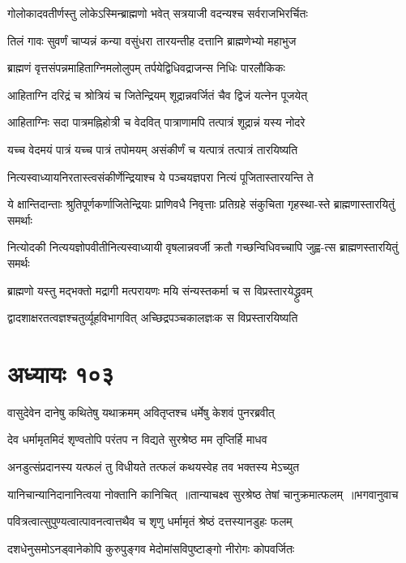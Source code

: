 \twolineshloka
{गोलोकादवतीर्णस्तु लोकेऽस्मिन्ब्राह्मणो भवेत्}
{सत्रयाजी वदन्यश्च सर्वराजभिरर्चितः}


\twolineshloka
{तिलं गावः सुवर्णं चाप्यन्नं कन्या वसुंधरा}
{तारयन्तीह दत्तानि ब्राह्मणेभ्यो महाभुज}


\twolineshloka
{ब्राह्मणं वृत्तसंपन्नमाहिताग्निमलोलुपम्}
{तर्पयेद्विधिवद्राजन्स निधिः पारलौकिकः}


\twolineshloka
{आहिताग्नि दरिद्रं च श्रोत्रियं च जितेन्द्रियम्}
{शूद्रान्नवर्जितं चैव द्विजं यत्नेन पूजयेत्}


\twolineshloka
{आहिताग्निः सदा पात्रमह्निहोत्री च वेदवित्}
{पात्राणामपि तत्पात्रं शूद्रान्नं यस्य नोदरे}


\twolineshloka
{यच्च वेदमयं पात्रं यच्च पात्रं तपोमयम्}
{असंकीर्णं च यत्पात्रं तत्पात्रं तारयिष्यति}


\twolineshloka
{नित्यस्वाध्यायनिरतास्त्वसंकीर्णेन्द्रियाश्च ये}
{पञ्चयज्ञपरा नित्यं पूजितास्तारयन्ति ते}


\twolineshloka
{ये क्षान्तिदान्ताः श्रुतिपूर्णकर्णाजितेन्द्रियाः प्राणिवधै निवृत्ताः}
{प्रतिग्रहे संकुचिता गृहस्था-स्ते ब्राह्मणास्तारयितुं समर्थाः}


\twolineshloka
{नित्योदकी नित्ययज्ञोपवीतीनित्यस्वाध्यायी वृषलान्नवर्जी}
{क्रतौ गच्छन्विधिवच्चापि जुह्व-त्स ब्राह्मणस्तारयितुं समर्थः}


\twolineshloka
{ब्राह्मणो यस्तु मद्भक्तो मद्रागी मत्परायणः}
{मयि संन्यस्तकर्मा च स विप्रस्तारयेद्ध्रुवम्}


\twolineshloka
{द्वादशाक्षरतत्वज्ञश्चतुर्व्यूहविभागवित्}
{अच्छिद्रपञ्चकालज्ञःक स विप्रस्तारयिष्यति}


\chapter{अध्यायः १०३}
\twolineshloka
{वासुदेवेन दानेषु कथितेषु यथाक्रमम्}
{अवितृप्तश्च धर्मेषु केशवं पुनरब्रवीत्}


\twolineshloka
{देव धर्मामृतमिदं शृण्वतोपि परंतप}
{न विद्यते सुरश्रेष्ठ मम तृप्तिर्हि माधव}


\twolineshloka
{अनडुत्संप्रदानस्य यत्फलं तु विधीयते}
{तत्फलं कथयस्वेह तव भक्तस्य मेऽच्युत}


\twolineshloka
{यानिचान्यानिदानानित्वया नोक्तानि कानिचित् ॥तान्याचक्ष्व सुरश्रेष्ठ तेषां चानुक्रमात्फलम् ॥भगवानुवाच}
{}


\twolineshloka
{पवित्रत्वात्सुपुण्यत्वात्पावनत्वात्तथैव च}
{शृणु धर्मामृतं श्रेष्ठं दत्तस्यानडुहः फलम्}


\twolineshloka
{दशधेनुसमोऽनड्वानेकोपि कुरुपुङ्गव}
{मेदोमांसविपुष्टाङ्गो नीरोगः कोपवर्जितः}


